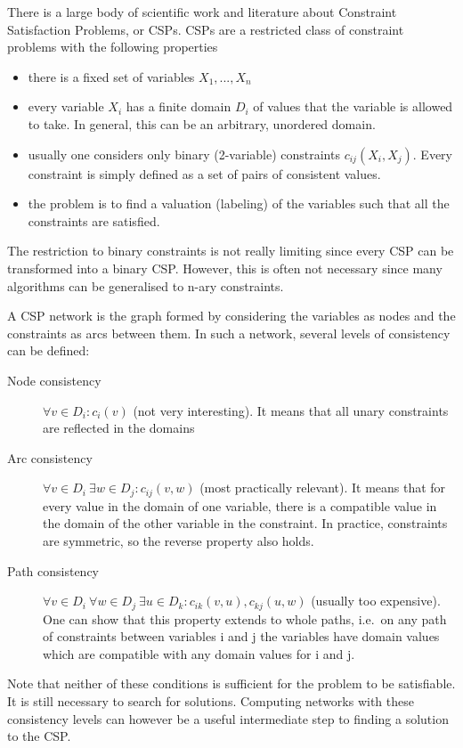 There is a large body of scientific work and literature about
Constraint Satisfaction Problems, or CSPs.
CSPs are a restricted class of constraint problems with the
following properties
\enableunderscores
\begin{itemize}
\item there is a fixed set of variables $X_1, ..., X_n$
\item every variable $X_i$ has a finite domain $D_i$ of values that the variable
        is allowed to take. In general, this can be an arbitrary, unordered
        domain.
\item usually one considers only binary (2-variable) constraints $c_{ij}(X_i,X_j)$.
        Every constraint is simply defined as a set of pairs of consistent values.
\item the problem is to find a valuation (labeling) of the variables such
        that all the constraints are satisfied.
\end{itemize}
\disableunderscores
The restriction to binary constraints is not really limiting since every CSP
can be transformed into a binary CSP. However, this is often not necessary
since many algorithms can be generalised to n-ary constraints.

A CSP network is the graph formed by considering the variables as nodes
and the constraints as arcs between them.
In such a network, several levels of consistency can be defined:
\enableunderscores
\begin{description}
\item[Node consistency] $\forall{v \in D_i} : c_i(v)$
        (not very interesting).  It means that
	all unary constraints are reflected in the domains
\item[Arc consistency] $\forall{v \in D_i}\ \exists{w \in D_j} : c_{ij}(v,w)$
	(most practically relevant).
	It means that for every value in the domain of one
	variable, there is a compatible value in the domain of the
	other variable in the constraint.  In practice, constraints
	are symmetric, so the reverse property also holds.
\item[Path consistency] $\forall{v \in D_i}\ \forall{w \in D_j}\ \exists{u \in D_k} : c_{ik}(v,u), c_{kj}(u,w)$
        (usually too expensive). One can show that this property extends to
	whole paths, i.e.\ on any path of constraints between variables i and j 
	the variables have domain values which are compatible with any
	domain values for i and j.
\end{description}
\disableunderscores
Note that neither of these conditions is sufficient for the
problem to be satisfiable. It is still necessary to search for solutions.
Computing networks with these consistency levels can however be a useful
intermediate step to finding a solution to the CSP.

